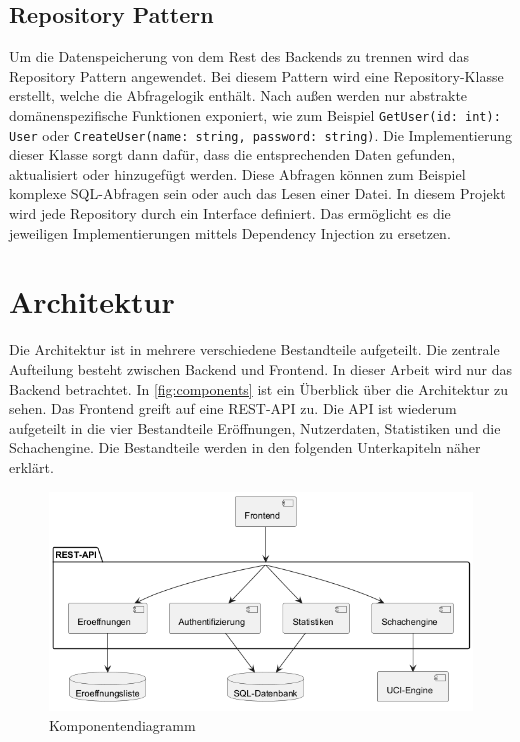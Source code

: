 \subsection{Repository Pattern}
Um die Datenspeicherung von dem Rest des Backends zu trennen wird das Repository Pattern angewendet. Bei diesem Pattern wird eine Repository-Klasse erstellt, welche die Abfragelogik enthält. Nach außen werden nur abstrakte domänenspezifische Funktionen exponiert, wie zum Beispiel \lstinline{GetUser(id: int): User} oder \lstinline{CreateUser(name: string, password: string)}. Die Implementierung dieser Klasse sorgt dann dafür, dass die entsprechenden Daten gefunden, aktualisiert oder hinzugefügt werden. Diese Abfragen können zum Beispiel komplexe SQL-Abfragen sein oder auch das Lesen einer Datei. In diesem Projekt wird jede Repository durch ein Interface definiert. Das ermöglicht es die jeweiligen Implementierungen mittels Dependency Injection zu ersetzen. \cite{evans_domain-driven_2004}

\section{Architektur}
Die Architektur ist in mehrere verschiedene Bestandteile aufgeteilt. Die zentrale Aufteilung besteht zwischen Backend und Frontend. In dieser Arbeit wird nur das Backend betrachtet. In \autoref{fig:components} ist ein Überblick über die Architektur zu sehen. Das Frontend greift auf eine \ac{REST}-API zu.
Die API ist wiederum aufgeteilt in die vier Bestandteile Eröffnungen, Nutzerdaten, Statistiken und die Schachengine.
Die Bestandteile werden in den folgenden Unterkapiteln näher erklärt.

\begin{figure}[h]
    \includegraphics[width=\linewidth]{images/diagrams/components.png}
    \caption{Komponentendiagramm}
    \label{fig:components}
\end{figure}

